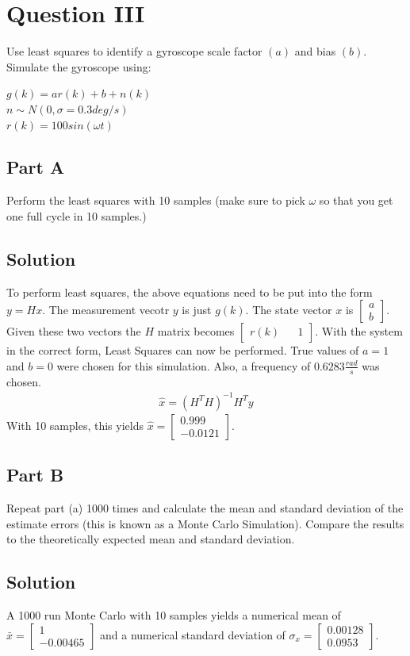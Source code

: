 \documentclass{article}
\begin{document}
\section*{Question III}
Use least squares to identify a gyroscope scale factor $(a)$ and bias $(b)$.  Simulate the gyroscope using:
\begin{center}
    $g(k) = ar(k) + b + n(k)$\\
    $n\sim N(0, \sigma = 0.3 deg/s)$\\
    $r(k) = 100sin(\omega t)$
\end{center}
\subsection*{Part A}
Perform the least squares with 10 samples (make sure to pick $\omega$ so that you get one full cycle in 10 samples.)
\subsection*{Solution}
To perform least squares, the above equations need to be put into the form $y = Hx$.  The measurement vecotr $y$ is just $g(k)$.  The state 
vector $x$ is $\begin{bmatrix} a \\ b \end{bmatrix}$.  Given these two vectors the $H$ matrix becomes $\begin{bmatrix} r(k) && 1 \end{bmatrix}$.
With the system in the correct form, Least Squares can now be performed.  True values of $a = 1$ and $b=0$ were chosen for this simulation.
Also, a frequency of $0.6283 \frac{rad}{s}$ was chosen.
\begin{gather*}
    \hat{x} = (H^T H)^{-1}H^T y
\end{gather*}
With 10 samples, this yields $\hat{x} = \begin{bmatrix} 0.999 \\ -0.0121 \end{bmatrix}$.

\subsection*{Part B}
Repeat part (a) 1000 times and calculate the mean and standard deviation of the estimate errors (this is known as a Monte Carlo Simulation).  
Compare the results to the theoretically expected mean and standard deviation.
\subsection*{Solution}
A 1000 run Monte Carlo with 10 samples yields a numerical mean of $\bar{x} = \begin{bmatrix} 1 \\ -0.00465 \end{bmatrix}$ and a numerical 
standard deviation of $\sigma_x = \begin{bmatrix} 0.00128 \\ 0.0953 \end{bmatrix}$.  
\end{document}
